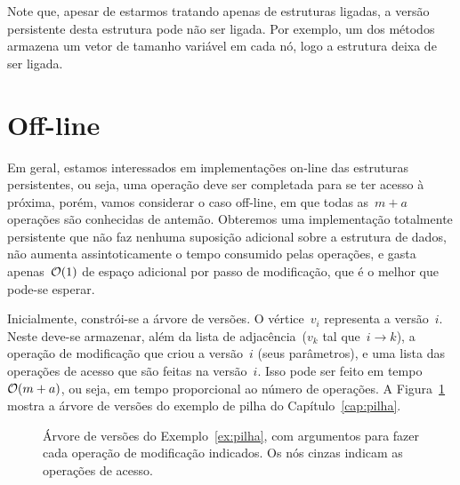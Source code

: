 \documentclass[../../main.tex]{subfiles}
\begin{document}
Note que, apesar de estarmos tratando apenas de estruturas ligadas, a versão persistente desta estrutura pode não ser ligada. Por exemplo, um dos métodos armazena um vetor de tamanho variável em cada nó, logo a estrutura deixa de ser ligada.

\section{Off-line}

Em geral, estamos interessados em implementações on-line das estruturas persistentes, ou seja, uma operação deve ser completada para se ter acesso à próxima, porém, vamos considerar o caso off-line, em que todas as~$m+a$ operações são conhecidas de antemão. Obteremos uma implementação totalmente persistente que não faz nenhuma suposição adicional sobre a estrutura de dados, não aumenta assintoticamente o tempo consumido pelas operações, e gasta apenas~$\mathcal{O}(1)$ de espaço adicional por passo de modificação, que é o melhor que pode-se esperar.

Inicialmente, constrói-se a árvore de versões. O vértice~$v_i$ representa a versão~$i$. Neste deve-se armazenar, além da lista de adjacência~($v_k$ tal que~$i \rightarrow k$), a operação de modificação que criou a versão~$i$ (seus parâmetros), e uma lista das operações de acesso que são feitas na versão~$i$. Isso pode ser feito em tempo~$\mathcal{O}(m+a)$, ou seja, em tempo proporcional ao número de operações.
A Figura~\ref{fig:vertree_ex} mostra a árvore de versões do exemplo de pilha do Capítulo~\ref{cap:pilha}.

\begin{figure}
	\centering
	\caption{Árvore de versões do Exemplo~\ref{ex:pilha}, com argumentos para fazer cada operação de modificação indicados. Os nós cinzas indicam as operações de acesso.} \label{fig:vertree_ex}
\end{figure}
\end{document}
